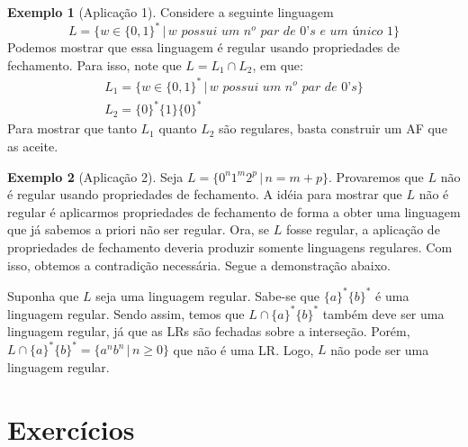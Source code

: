 \documentclass[a4paper]{article}
\theoremstyle{definition}
\newtheorem{Example}{Exemplo}
\begin{document}
  \begin{Example}[Aplicação 1]\label{exemplo1}
    Considere a seguinte linguagem
    \[
      L=\{w \in \{0,1\}^*\,|\,w \textit{ possui um
        n}^o\textit{ par de 0's e um único 1}\}
    \]
    Podemos mostrar que essa linguagem é regular usando propriedades de
    fechamento. Para isso, note que $L = L_1 \cap L_2$, em que:
    \[
      \begin{array}{l}
        L_1 = \{w \in \{0,1\}^*\,|\,w\textit{ possui um n}^o\textit{ par de
        0's}\}\\
        L_2 = \{0\}^*\{1\}\{0\}^*
      \end{array}
    \]
    Para mostrar que tanto $L_1$ quanto $L_2$ são regulares, basta construir
    um AF que as aceite.
  \end{Example}
  
  \begin{Example}[Aplicação 2]
    Seja $L=\{0^n1^m2^p\,|\,n = m + p\}$. Provaremos que $L$ não é regular
    usando propriedades de fechamento. A idéia para mostrar que $L$ não é
    regular é aplicarmos propriedades de fechamento de forma a obter uma
    linguagem que já sabemos a priori não ser regular. Ora, se $L$ fosse
    regular, a aplicação de propriedades de fechamento deveria produzir
    somente linguagens regulares. Com isso, obtemos a contradição necessária.
    Segue a demonstração abaixo.

    Suponha que $L$ seja uma linguagem regular. Sabe-se que $\{a\}^*\{b\}^*$ é
    uma linguagem regular. Sendo assim, temos que $L\cap \{a\}^*\{b\}^*$ também
    deve ser uma linguagem regular, já que as LRs são fechadas sobre a
    interseção. Porém, $L\cap \{a\}^*\{b\}^* = \{a^nb^n\,|\,n \geq 0\}$ que
    não é uma LR. Logo, $L$ não pode ser uma linguagem regular.
  \end{Example}
 
  \section{Exercícios}
\end{document}
